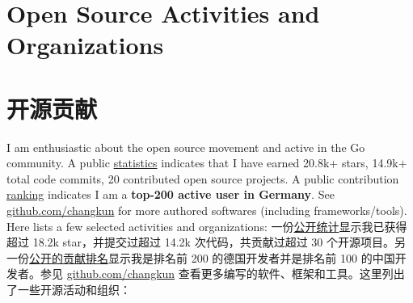  {
  \section{\textbf{Open Source Activities and Organizations}}
}{
  \section{\textbf{开源贡献}}
}
\small
{} {
  I am enthusiastic about the open source movement and active in the Go community. A public \href{https://github-readme-stats.vercel.app/api?username=changkun&include_all_commits=true}{statistics} indicates that I have earned 20.8k+ stars, 14.9k+ total code commits, 20 contributed open source projects. A public contribution \href{https://github.com/gayanvoice/top-github-users/blob/ed45cf875be53808b18f74c59e6b5f49aac98ee2/markdown/public_contributions/germany.md}{ranking} indicates I am a \textbf{top-200 active user in Germany}. See \href{https://github.com/changkun}{github.com/changkun} for more authored softwares (including frameworks/tools). Here lists a few selected activities and organizations:
}{
  一份\href{https://github-readme-stats.vercel.app/api?username=changkun&include_all_commits=true}{公开统计}显示我已获得超过 18.2k star，并提交过超过 14.2k 次代码，共贡献过超过 30 个开源项目。另一份\href{https://github.com/gayanvoice/top-github-users/blob/858980e5cb10d1b4c27a24d36ae6547aa0f195cd/markdown/public_contributions/germany.md}{公开的贡献排名}显示我是排名前 200 的德国开发者并是排名前 100 的中国开发者。参见 \href{https://github.com/changkun}{github.com/changkun} 查看更多编写的软件、框架和工具。这里列出了一些开源活动和组织：
}
